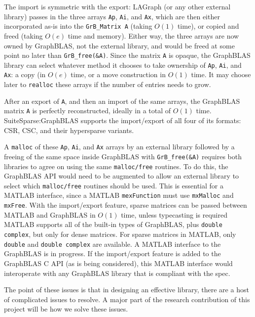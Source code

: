 The import is symmetric with the export:  LAGraph (or any other external
library) passes in the three arrays \verb'Ap', \verb'Ai', and \verb'Ax', which
are then either incorporated as-is into the \verb'GrB_Matrix A' (taking $O(1)$
time), or copied and freed (taking $O(e)$ time and memory).  Either way, the
three arrays are now owned by GraphBLAS, not the external library, and would be
freed at some point no later than \verb'GrB_free(&A)'.  Since the matrix
\verb'A' is opaque, the GraphBLAS library can select whatever method it chooses
to take ownership of \verb'Ap', \verb'Ai', and \verb'Ax': a copy (in $O(e)$
time, or a move construction in $O(1)$ time.  It may choose later to
\verb'realloc' these arrays if the number of entries needs to grow.

After an export of \verb'A', and then an import of the same arrays, the
GraphBLAS matrix \verb'A' is perfectly reconstructed, ideally in a total of
$O(1)$ time.  SuiteSparse:GraphBLAS supports the import/export of all four of
its formats: CSR, CSC, and their hypersparse variants.

A \verb'malloc' of these \verb'Ap', \verb'Ai', and \verb'Ax' arrays by an
external library followed by a freeing of the same space inside GraphBLAS with
\verb'GrB_free(&A)' requires both libraries to agree on using the same
\verb'malloc/free' routines.  To do this, the GraphBLAS API would need to be
augmented to allow an external library to select which \verb'malloc/free'
routines should be used.  This is essential for a MATLAB interface,
since a MATLAB \verb'mexFunction' must use \verb'mxMalloc' and \verb'mxFree'.
With the import/export feature, sparse matrices can be passed between MATLAB
and GraphBLAS in $O(1)$ time, unless typecasting is required MATLAB supports
all of the built-in types of GraphBLAS, plus \verb'double complex', but only
for dense matrices.  For sparse matrices in MATLAB, only \verb'double' and
\verb'double complex' are available.  A MATLAB interface to the GraphBLAS is in
progress.  If the import/export feature is added to the GraphBLAS C API (as is
being considered), this MATLAB interface would interoperate with any GraphBLAS
library that is compliant with the spec.

The point of these issues is that in designing an effective library, there are a host of 
complicated issues to resolve.  A major part of the research contribution of this project will
be how we solve these issues.

